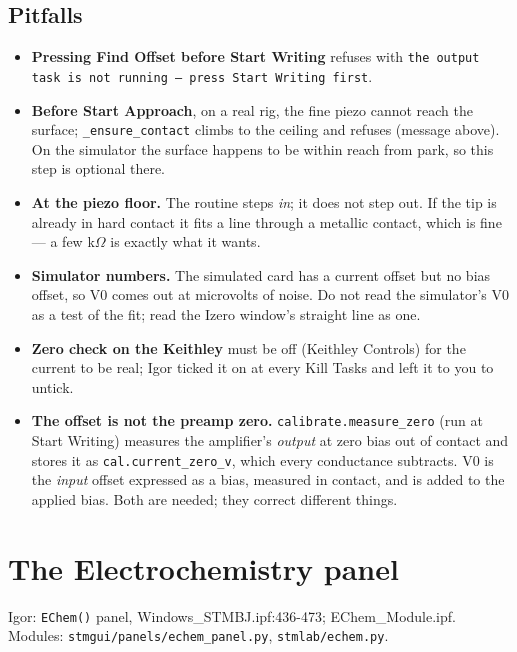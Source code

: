 \section{Pitfalls}

\begin{itemize}[leftmargin=*]
\item \textbf{Pressing Find Offset before Start Writing} refuses with \texttt{the output task is not running -- press Start Writing first}.
\item \textbf{Before Start Approach}, on a real rig, the fine piezo cannot reach the surface; \texttt{\_\discretionary{}{}{}ensure\_\discretionary{}{}{}contact} climbs to the ceiling and refuses (message above). On the simulator the surface happens to be within reach from park, so this step is optional there.
\item \textbf{At the piezo floor.} The routine steps \emph{in}; it does not step out. If the tip is already in hard contact it fits a line through a metallic contact, which is fine --- a few k$\Omega$ is exactly what it wants.
\item \textbf{Simulator numbers.} The simulated card has a current offset but no bias offset, so V0 comes out at microvolts of noise. Do not read the simulator's V0 as a test of the fit; read the Izero window's straight line as one.
\item \textbf{Zero check on the Keithley} must be off (Keithley Controls) for the current to be real; Igor ticked it on at every Kill Tasks and left it to you to untick.
\item \textbf{The offset is not the preamp zero.} \texttt{calibrate.\discretionary{}{}{}measure\_\discretionary{}{}{}zero} (run at Start Writing) measures the amplifier's \emph{output} at zero bias out of contact and stores it as \texttt{cal.\discretionary{}{}{}current\_\discretionary{}{}{}zero\_\discretionary{}{}{}v}, which every conductance subtracts. V0 is the \emph{input} offset expressed as a bias, measured in contact, and is added to the applied bias. Both are needed; they correct different things.
\end{itemize}

\setcounter{chapter}{43}
\chapter{The Electrochemistry panel}

\begin{keybox}\small Igor: \texttt{EChem()} panel, Windows\_STMBJ.ipf:436-473; EChem\_Module.ipf. Modules: \texttt{stmgui/\discretionary{}{}{}panels/\discretionary{}{}{}echem\_\discretionary{}{}{}panel.\discretionary{}{}{}py}, \texttt{stmlab/\discretionary{}{}{}echem.\discretionary{}{}{}py}.\end{keybox}

